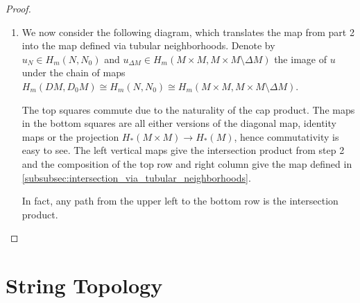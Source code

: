 \documentclass{scrartcl}
\theoremstyle{plain}
\theoremstyle{definition}
\newcommand{\capp}{\mathbin{\frown}}
\newcommand{\iso}{\cong}
\begin{document}
\begin{proof}
\begin{enumerate}
        \item We now consider the following diagram, which translates the map from part 2 into the map defined via tubular neighborhoods.  Denote by $u_N\in H_m(N, N_0)$ and $u_{\Delta M}\in H_m(M\times M, M\times M\setminus \Delta M)$ the image of $u$ under the chain of maps $H_m(DM, D_0M) \iso H_m(N, N_0) \iso H_m(M\times M, M\times M\setminus \Delta M)$.
        
        \begin{center}
        \end{center}

        The top squares commute due to the naturality of the cap product. The maps in the bottom squares are all either versions of the diagonal map, identity maps or the projection $H_*(M\times M)\to H_*(M)$, hence commutativity is easy to see. The left vertical maps give the intersection product from step 2 and the composition of the top row and right column give the map defined in \ref{subsubsec:intersection_via_tubular_neighborhoods}.

        In fact, any path from the upper left to the bottom row is the intersection product.

    \end{enumerate}

\end{proof}











\section{String Topology}
\end{document}
